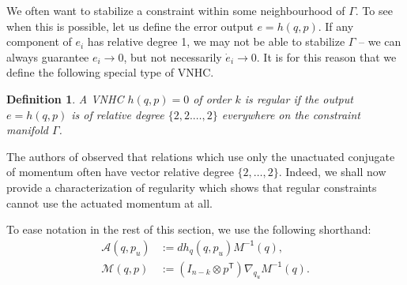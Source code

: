 \documentclass[journal,twoside,web]{ieeecolor}
\newtheorem{defn}[thm]{Definition} %
\newcommand*{\tpose}{^\mathsf{T}}
\newcommand*{\Minv}{M^\mathsf{-1}}
\newcommand*{\Id}[1]{I_{#1}}
\begin{document}
We often want to stabilize a constraint within some neighbourhood of \(\Gamma\).
To see when this is possible, let us define the error output \(e = h(q,p)\).
If any component of \(e_i\) has relative degree 1, we may not be able
to stabilize \(\Gamma\) -- we can always guarantee \(e_i \to 0\), but not
necessarily \(\dot{e}_i \to 0\).
It is for this reason that we define the following special type of VNHC.

\begin{defn}
    A VNHC \(h(q,p) = 0\) of order \(k\) is \textit{regular} if the output 
    \(e = h(q,p)\) is of relative degree \(\{2,2.\ldots,2\}\) everywhere on the
    constraint manifold \(\Gamma\).
\end{defn}

The authors of
\cite{nhvc_dynamic_walking,hybrid_zero_dynamics_bipedal_nhvcs}
observed that relations which use only the unactuated conjugate of momentum
often have vector relative degree \(\{2,\ldots,2\}\).
Indeed, we shall now provide a characterization of regularity which shows that
regular constraints cannot use the actuated momentum at all.

To ease notation in the rest of this section, we use the following shorthand:
\begin{align}
    \mathcal{A}(q,p_u) &:= dh_q(q,p_u) \Minv(q) 
        ,\\
    \mathcal{M}(q,p) &:= (\Id{n-k} \otimes p\tpose)\nabla_{q_u}\Minv(q) 
    .
\end{align}
\end{document}
